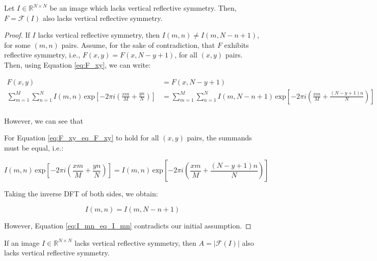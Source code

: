 \begin{lemma}
\label{lemma:F_lack_refl_symm}
    Let $I\in \mathbb{R}^{N\times N}$ be an image which lacks vertical reflective symmetry. Then, $F = \mathcal{F}(I)$ also lacks vertical reflective symmetry.
\end{lemma}

\begin{proof}
    If $I$ lacks vertical reflective symmetry, then $I(m,n) \neq I(m,N-n+1)$, for some $(m,n)$ pairs. Assume, for the sake of contradiction, that $F$ exhibits reflective symmetry, i.e., $F(x,y) = F(x,N-y+1)$, for all $(x,y)$ pairs. Then, using Equation \ref{eq:F_xy},  we can write:

    \begin{align}
        F(x,y) &= F(x,N-y+1)\\
        \sum_{m=1}^{M} \sum_{n=1}^{N}I(m,n) \, \mathrm{exp}\left[ -2\pi i \left( \frac{xm}{M} + \frac{yn}{N}\right) \right] &= \sum_{m=1}^{M} \sum_{n=1}^{N}I(m,N-n+1) \, \mathrm{exp}\left[ -2\pi i \left( \frac{xm}{M} + \frac{(N-y+1)n}{N}\right) \right] \label{eq:F_xy_eq_F_xy}\\
    \end{align}

   However, we can see that 
    
    
    For Equation \ref{eq:F_xy_eq_F_xy} to hold for all $(x,y)$ pairs, the summands must be equal, i.e.:

    \begin{equation}
        I(m,n) \, \mathrm{exp}\left[ -2\pi i \left( \frac{xm}{M} + \frac{yn}{N}\right) \right] = I(m,n) \, \mathrm{exp}\left[ -2\pi i \left( \frac{xm}{M} + \frac{(N-y+1)n}{N}\right) \right]
    \end{equation}

    Taking the inverse DFT of both sides, we obtain:

    \begin{equation}
    \label{eq:I_mn_eq_I_mn}
        I(m,n) = I(m,N-n+1)
    \end{equation}

    However, Equation \ref{eq:I_mn_eq_I_mn} contradicts our initial assumption.
\end{proof}

\begin{corollary}
\label{cor:F_lack_refl_symm}
     If an image $I\in \mathbb{R}^{N\times N}$ lacks vertical reflective symmetry, then $A = |\mathcal{F}(I)|$ also lacks vertical reflective symmetry.
\end{corollary}



